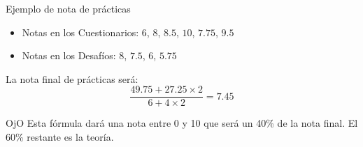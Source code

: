 \documentclass[usenames,dvipsnames,aspectratio=169]{beamer}
\begin{document}
\begin{frame}{Ejemplo de nota de prácticas}
\setlength{\belowdisplayskip}{0pt}
    \begin{itemize}
        \item Notas en los Cuestionarios: $6$, $8$, $8.5$, $10$, $7.75$, $9.5$
        \item Notas en los Desafíos: $8$, $7.5$, $6$, $5.75$
    \end{itemize}
    La nota final de prácticas será:
    \begin{equation*}
        \frac{49.75 + 27.25 \times 2}{6 + 4 \times 2} = 7.45
    \end{equation*}
    \begin{block}{OjO}
        Esta fórmula dará una nota entre 0 y 10 que será un 40\% de la nota final. El 60\% restante es la teoría.
    \end{block}
\end{frame}


\end{document}
